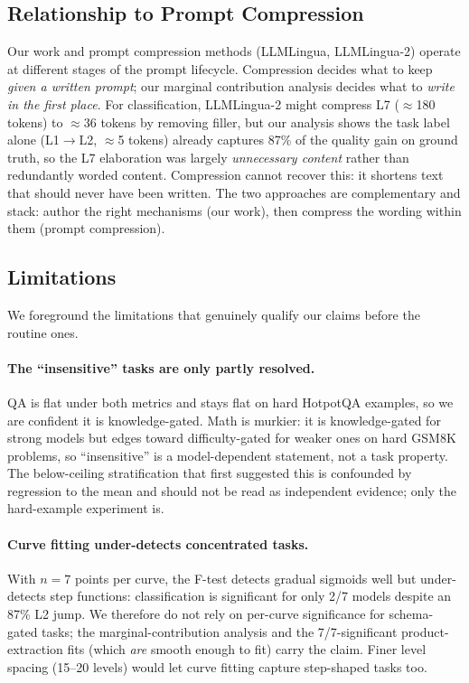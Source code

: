 \subsection{Relationship to Prompt Compression}

Our work and prompt compression methods (LLMLingua, LLMLingua-2) operate at
different stages of the prompt lifecycle.
Compression decides what to keep \emph{given a written prompt}; our marginal
contribution analysis decides what to \emph{write in the first place}.
For classification, LLMLingua-2 might compress L7 ($\approx$180 tokens) to
$\approx$36 tokens by removing filler, but our analysis shows the task label
alone (L1$\to$L2, $\approx$5 tokens) already captures 87\% of the quality gain
on ground truth, so the L7 elaboration was largely \emph{unnecessary content}
rather than redundantly worded content.
Compression cannot recover this: it shortens text that should never have been
written.
The two approaches are complementary and stack: author the right mechanisms
(our work), then compress the wording within them (prompt compression).

\subsection{Limitations}
\label{sec:limitations}

We foreground the limitations that genuinely qualify our claims before the
routine ones.

\paragraph{The ``insensitive'' tasks are only partly resolved.}
QA is flat under both metrics and stays flat on hard HotpotQA examples, so we
are confident it is knowledge-gated. Math is murkier: it is knowledge-gated for
strong models but edges toward difficulty-gated for weaker ones on hard GSM8K
problems, so ``insensitive'' is a model-dependent statement, not a task
property. The below-ceiling stratification that first suggested this is
confounded by regression to the mean and should not be read as independent
evidence; only the hard-example experiment is.

\paragraph{Curve fitting under-detects concentrated tasks.}
With $n = 7$ points per curve, the F-test detects gradual sigmoids well but
under-detects step functions: classification is significant for only 2/7 models
despite an 87\% L2 jump. We therefore do not rely on per-curve significance for
schema-gated tasks; the marginal-contribution analysis and the 7/7-significant
product-extraction fits (which \emph{are} smooth enough to fit) carry the
claim. Finer level spacing (15--20 levels) would let curve fitting capture
step-shaped tasks too.


